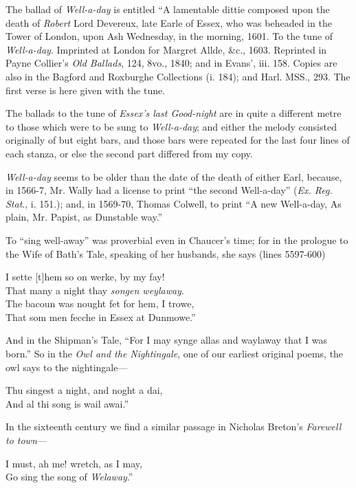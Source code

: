 The ballad of \textit{Well-a-day} is entitled “A lamentable dittie composed upon the
death of \textit{Robert} Lord Devereux, late Earle of Essex, who was beheaded in the
Tower of London, upon Ash Wednesday, in the morning, 1601. To the tune of
\textit{Well-a-day}. Imprinted at London for Margret Allde, \&c., 1603. Reprinted in
Payne Collier’s \textit{Old Ballads}, 124, 8vo., 1840; and in Evans’, iii. 158. Copies
are also in the Bagford and Roxburghe Collections (i. 184); and Harl. MSS.,
293. The first verse is here given with the tune.

The ballads to the tune of \textit{Essex's last Good-night} are in quite a different metre
to those which were to be sung to \textit{Well-a-day}; and either the melody consisted
originally of but eight bars, and those bars were repeated for the last four lines
of each stanza, or else the second part differed from my copy.

\textit{Well-a-day} seems to be older than the date of the death of either Earl, because,
in 1566-7, Mr. Wally had a license to print “the second Well-a-day” (\textit{Ex. Reg.
Stat}., i. 151.); and, in 1569-70, Thomas Colwell, to print “A new Well-a-day,
As plain, Mr. Papist, as Dunstable way.”

To “sing well-away” was proverbial even in Chaucer’s time; for in the prologue
to the Wife of Bath’s Tale, speaking of her husbands, she says (lines
5597-600)
\settowidth{\versewidth}{I sette [t]hem so on werke, by my fay!}
\begin{scverse}
I sette [t]hem so on werke, by my fay!\\
That many a night thay \textit{songen weylaway}.\\
The bacoun was nought fet for hem, I trowe,\\
That som men fecche in Essex at Dunmowe.” 
\end{scverse}
And in the Shipman’s Tale, “For I may synge allas and waylaway that I was
born.” So in the \textit{Owl and the Nightingale}, one of our earliest original poems, the
owl says to the nightingale—
\settowidth{\versewidth}{Thu singest a night, and noght a dai,}
\begin{scverse}
Thu singest a night, and noght a dai,\\
And al thi song is wail awai.”
\end{scverse}
In the sixteenth century we find a similar passage in Nicholas Breton’s \textit{Farewell
to town}—
\begin{scverse}
I must, ah me! wretch, as I may,\\
Go sing the song of \textit{Welaway}.”
\end{scverse}

